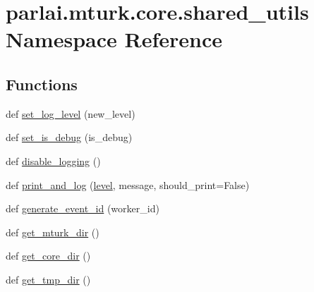 \hypertarget{namespaceparlai_1_1mturk_1_1core_1_1shared__utils}{}\section{parlai.\+mturk.\+core.\+shared\+\_\+utils Namespace Reference}
\label{namespaceparlai_1_1mturk_1_1core_1_1shared__utils}
\subsection*{Functions}
\begin{DoxyCompactItemize}
\item 
def \hyperlink{namespaceparlai_1_1mturk_1_1core_1_1shared__utils_ac8a4f9a9107ed8eca14da5117922fbee}{set\+\_\+log\+\_\+level} (new\+\_\+level)
\item 
def \hyperlink{namespaceparlai_1_1mturk_1_1core_1_1shared__utils_a8446a65c83fee3ccdfb7484ff5f3eedd}{set\+\_\+is\+\_\+debug} (is\+\_\+debug)
\item 
def \hyperlink{namespaceparlai_1_1mturk_1_1core_1_1shared__utils_ac9c2cb4e45eb5bb480df0cd8b18c64da}{disable\+\_\+logging} ()
\item 
def \hyperlink{namespaceparlai_1_1mturk_1_1core_1_1shared__utils_a9ffb0cdb3846323e276281cbeb16979a}{print\+\_\+and\+\_\+log} (\hyperlink{namespaceparlai_1_1mturk_1_1core_1_1shared__utils_abeee033e57a3bd47f1345c1ce2f73cf9}{level}, message, should\+\_\+print=False)
\item 
def \hyperlink{namespaceparlai_1_1mturk_1_1core_1_1shared__utils_aba2e4d48063dafc80e931f8925dbb755}{generate\+\_\+event\+\_\+id} (worker\+\_\+id)
\item 
def \hyperlink{namespaceparlai_1_1mturk_1_1core_1_1shared__utils_aabd480fc6090e1fa769ff3926f7e842d}{get\+\_\+mturk\+\_\+dir} ()
\item 
def \hyperlink{namespaceparlai_1_1mturk_1_1core_1_1shared__utils_ac4e340ccc66c691fdd294c734dae0c5d}{get\+\_\+core\+\_\+dir} ()
\item 
def \hyperlink{namespaceparlai_1_1mturk_1_1core_1_1shared__utils_aa0c7ddb9db866e2f19ec6a83112fc9d2}{get\+\_\+tmp\+\_\+dir} ()
\end{DoxyCompactItemize}
